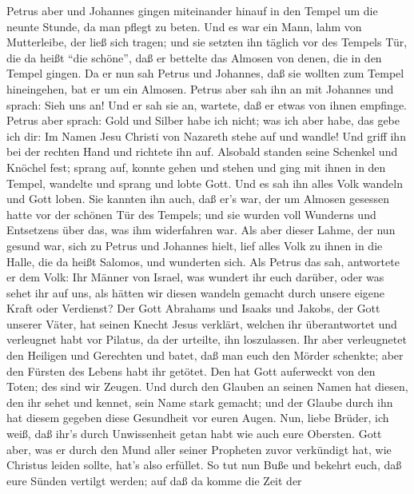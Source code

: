  Petrus aber und Johannes gingen miteinander hinauf in den
Tempel um die neunte Stunde, da man pflegt zu beten.  Und es
war ein Mann, lahm von Mutterleibe, der ließ sich tragen; und sie
setzten ihn täglich vor des Tempels Tür, die da heißt ``die schöne'',
daß er bettelte das Almosen von denen, die in den Tempel gingen.
 Da er nun sah Petrus und Johannes, daß sie wollten zum
Tempel hineingehen, bat er um ein Almosen.  Petrus aber sah
ihn an mit Johannes und sprach: Sieh uns an!  Und er sah sie
an, wartete, daß er etwas von ihnen empfinge.  Petrus aber
sprach: Gold und Silber habe ich nicht; was ich aber habe, das gebe ich
dir: Im Namen Jesu Christi von Nazareth stehe auf und wandle!
 Und griff ihn bei der rechten Hand und richtete ihn auf.
Alsobald standen seine Schenkel und Knöchel fest;  sprang
auf, konnte gehen und stehen und ging mit ihnen in den Tempel, wandelte
und sprang und lobte Gott.  Und es sah ihn alles Volk
wandeln und Gott loben.  Sie kannten ihn auch, daß er's
war, der um Almosen gesessen hatte vor der schönen Tür des Tempels; und
sie wurden voll Wunderns und Entsetzens über das, was ihm widerfahren
war.  Als aber dieser Lahme, der nun gesund war, sich zu
Petrus und Johannes hielt, lief alles Volk zu ihnen in die Halle, die da
heißt Salomos, und wunderten sich.  Als Petrus das sah,
antwortete er dem Volk: Ihr Männer von Israel, was wundert ihr euch
darüber, oder was sehet ihr auf uns, als hätten wir diesen wandeln
gemacht durch unsere eigene Kraft oder Verdienst?  Der Gott
Abrahams und Isaaks und Jakobs, der Gott unserer Väter, hat seinen
Knecht Jesus verklärt, welchen ihr überantwortet und verleugnet habt vor
Pilatus, da der urteilte, ihn loszulassen.  Ihr aber
verleugnetet den Heiligen und Gerechten und batet, daß man euch den
Mörder schenkte;  aber den Fürsten des Lebens habt ihr
getötet. Den hat Gott auferweckt von den Toten; des sind wir Zeugen.
 Und durch den Glauben an seinen Namen hat diesen, den ihr
sehet und kennet, sein Name stark gemacht; und der Glaube durch ihn hat
diesem gegeben diese Gesundheit vor euren Augen.  Nun,
liebe Brüder, ich weiß, daß ihr's durch Unwissenheit getan habt wie auch
eure Obersten.  Gott aber, was er durch den Mund aller
seiner Propheten zuvor verkündigt hat, wie Christus leiden sollte, hat's
also erfüllet.  So tut nun Buße und bekehrt euch, daß eure
Sünden vertilgt werden;  auf daß da komme die Zeit der
